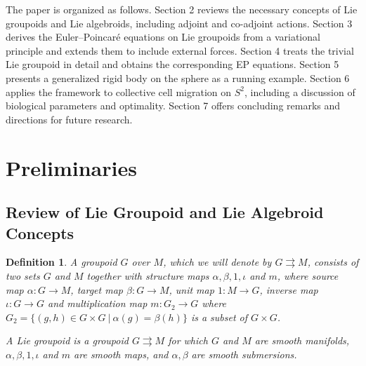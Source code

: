 \documentclass{article}
\newtheorem{definition}[theorem]{Definition}
\begin{document}

The paper is organized as follows. Section 2 reviews the necessary concepts of Lie groupoids and Lie algebroids, including adjoint and co-adjoint actions. Section 3 derives the Euler--Poincar\'e equations on Lie groupoids from a variational principle and extends them to include external forces. Section 4 treats the trivial Lie groupoid in detail and obtains the corresponding EP equations. Section 5 presents a generalized rigid body on the sphere as a running example. Section 6 applies the framework to collective cell migration on $S^2$, including a discussion of biological parameters and optimality. Section 7 offers concluding remarks and directions for future research.

\section{Preliminaries}
\subsection{Review of Lie Groupoid and Lie Algebroid Concepts}

\begin{definition}
\label{groupoid}
A groupoid $G$ over $M$, which we will denote by $G \rightrightarrows M$, consists of two sets $G$ and $M$ together with structure maps $\alpha, \beta, 1, \iota$ and $m$, where source map $\alpha: G \longrightarrow M$, target map $\beta:G \longrightarrow M$, unit map $1: M \longrightarrow G$, inverse map $\iota : G \longrightarrow G$ and multiplication map $ m: G_{2} \longrightarrow G$ where $ G_{2} = \lbrace (g,h) \in G \times G ~\vert ~ \alpha (g) = \beta (h) \rbrace$ is a subset of $G \times G$.

A Lie groupoid is a groupoid $G \rightrightarrows M$ for which $G$ and $M$ are smooth manifolds, $\alpha, \beta, 1, \iota$ and $m$ are smooth maps, and $\alpha,\beta$ are smooth submersions.
\end{definition}
\end{document}
